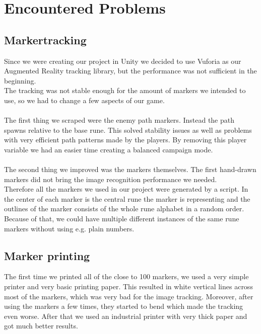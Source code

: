 \chapter{Encountered Problems}

\section{Markertracking}

Since we were creating our project in Unity we decided to use Vuforia as our Augmented Reality tracking library, but the performance was not sufficient in the beginning.\\
The tracking was not stable enough for the amount of markers we intended to use, so we had to change a few aspects of our game.\\\\
The first thing we scraped were the enemy path markers. Instead the path spawns relative to the base rune. This solved stability issues as well as problems with very efficient path patterns made by the players.
By removing this player variable we had an easier time creating a balanced campaign mode.\\\\
The second thing we improved was the markers themselves. The first hand-drawn markers did not bring the image recognition performance we needed.\\
Therefore all the markers we used in our project were generated by a script. In the center of each marker is the central rune the marker is representing and the outlines of the marker consists of the whole rune alphabet in a random order.
Because of that, we could have multiple different instances of the same rune markers without using e.g. plain numbers.\\

\section{Marker printing}

The first time we printed all of the close to 100 markers, we used a very simple printer and very basic printing paper.
This resulted in white vertical lines across most of the markers, which was very bad for the image tracking. 
Moreover, after using the markers a few times, they started to bend which made the tracking even worse.
After that we used an industrial printer with very thick paper and got much better results.

